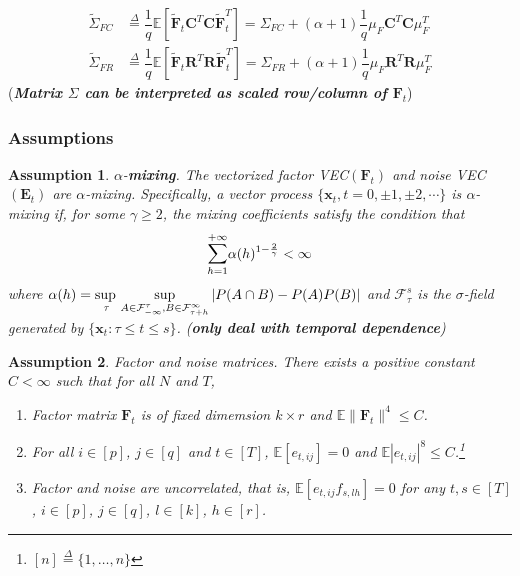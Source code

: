 \documentclass{article}[12pt]
\newtheorem{assumption}{Assumption}
\begin{document}
\begin{enumerate}
    \begin{equation} 
       \begin{split}
           \widetilde{\Sigma}_{FC} &\overset{\Delta}{=} \dfrac{1}{q}\mathbb{E}\left[\mathbf{\widetilde{F}}_t\mathbf{C}^T\mathbf{C}\mathbf{\widetilde{F}}_t^T\right] =   \Sigma_{FC} + (\alpha + 1)\dfrac{1}{q}\mu_F\mathbf{C}^T\mathbf{C}\mu_F^T \\
           \widetilde{\Sigma}_{FR} & \overset{\Delta}{=} \dfrac{1}{q}\mathbb{E}\left[\mathbf{\widetilde{F}}_t\mathbf{R}^T\mathbf{R}\mathbf{\widetilde{F}}_t^T\right] =   \Sigma_{FR} + (\alpha + 1)\dfrac{1}{q}\mu_F\mathbf{R}^T\mathbf{R}\mu_F^T 
       \end{split}
    \end{equation}
    \noindent (\textbf{\textit{Matrix $\Sigma$ can be interpreted as scaled row/column of $\mathbf{F}_t$}})
\end{enumerate}

\subsubsection{Assumptions}

\begin{assumption}\label{assumption 1 1.7.1}
    $\alpha$-\textbf{mixing}. \normalfont The vectorized factor VEC$(\mathbf{F}_t)$ and noise VEC$(\mathbf{E}_t)$ are $\alpha$-mixing. Specifically, a vector process $\{\mathbf{x}_t, t=0, \pm 1,\pm 2,\cdots\}$ is $\alpha$-mixing if, for some $\gamma \geq 2$, the mixing coefficients satisfy the condition that
    $$\mathlarger{\sum}_{h=1}^{+\infty} \alpha(h)^{1-\frac{2}{\gamma}} < \infty$$
    where $\alpha(h) =  \adjustlimits\sup_{\tau}\sup_{A \in \mathcal{F}_{-\infty}^{\tau}, B \in \mathcal{F}_{\tau + h}^{\infty}}|P(A\cap B)-P(A)P(B)|$ and $\mathcal{F}_{\tau}^s$ is the $\sigma$-field generated by $\{\mathbf{x}_t:\tau \leq t \leq s\}$.
    (\textbf{\textit{only deal with temporal dependence}})
\end{assumption}
 
\begin{assumption}\label{assumption 2 1.7.1}
    Factor and noise matrices. \normalfont There exists a positive constant $C < \infty$ such that for all $N$ and $T$,
    \begin{enumerate}
        \item Factor matrix $\mathbf{F}_t$ is of fixed dimemsion $k \times r$ and $\mathbb{E}\lVert\mathbf{F}_t\rVert^4\leq C $.
        \item For all $i \in \left[p\right]$, $j \in \left[q\right]$ and $t \in \left[T\right]$, $\mathbb{E}\left[e_{t,ij}\right]=0$ and $\mathbb{E}|e_{t,ij}|^8 \leq C$.\footnote{$\left[n\right] \overset{\Delta}{=} \{1,\dots,n\}$}
        \item Factor and noise are uncorrelated, that is, $\mathbb{E}\left[e_{t,ij}f_{s,lh}\right]=0$ for any $t,s \in \left[T\right]$, $i \in \left[p\right]$, $j \in \left[q\right]$, $l \in \left[k\right]$, $h \in \left[r\right]$.
    \end{enumerate}
\end{assumption}
\end{document}
